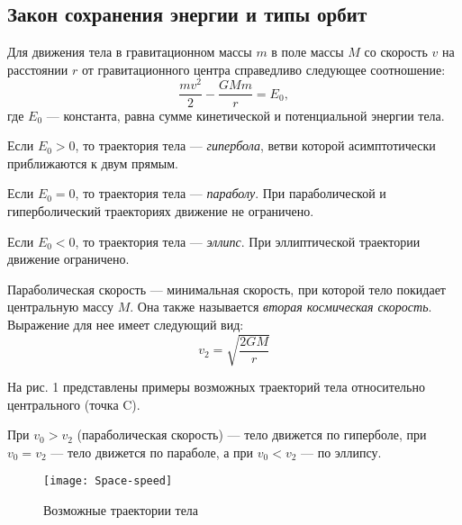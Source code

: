 \subsection{Закон сохранения энергии и типы орбит}
Для движения тела в гравитационном массы $m$ в поле массы $M$ со 
скорость $v$ на расстоянии $r$ от гравитационного центра
справедливо следующее соотношение: \begin{equation}
\frac{m v^2}{2}-\frac{GM m }{r}=E_0,
\end{equation}
где $E_0$ --- константа, равна сумме кинетической и 
потенциальной энергии тела.

Если $E_0>0$, то траектория тела --- {\itshape гипербола}, 
ветви которой асимптотически приближаются к двум прямым.

Если $E_0=0$, то траектория тела --- {\itshape параболу}. При 
параболической и гиперболический траекториях движение не 
ограничено.

Если $E_0<0$, то траектория тела --- {\itshape эллипс}. При 
эллиптической траектории движение ограничено.

Параболическая скорость --- минимальная скорость, при которой 
тело покидает центральную массу $M$. Она также называется
{\itshape вторая космическая скорость}. Выражение для нее 
имеет следующий вид:\begin{equation}
v_{2}=\sqrt{\frac{2GM}{r}}
\end{equation}

На рис. 1 представлены примеры возможных траекторий тела 
относительно центрального (точка C).

При $v_0 > v_{2}$ (параболическая скорость) --- тело движется 
по гиперболе, при $v_0 = v_{2}$ --- тело движется по параболе, 
а при $v_0 < v_{2}$ --- по эллипсу.
\begin{figure}[h!]
\centering
\texttt{[image: Space-speed]}
\caption{Возможные траектории тела}
\end{figure}